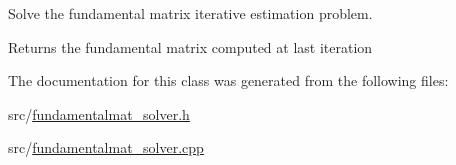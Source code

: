 Solve the fundamental matrix iterative estimation problem. 

\begin{DoxyReturn}{Returns}
the fundamental matrix computed at last iteration 
\end{DoxyReturn}


The documentation for this class was generated from the following files\+:\begin{DoxyCompactItemize}
\item 
src/\hyperlink{fundamentalmat__solver_8h}{fundamentalmat\+\_\+solver.\+h}\item 
src/\hyperlink{fundamentalmat__solver_8cpp}{fundamentalmat\+\_\+solver.\+cpp}\end{DoxyCompactItemize}
